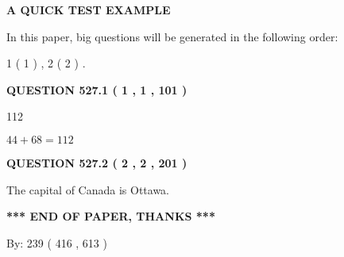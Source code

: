 \documentclass[12pt]{article}
\begin{document}
   
   
   
   
   
 \vspace{0.2in}
{\LARGE {\textbf{ A QUICK TEST EXAMPLE}}}
   
   
   
\vspace{0.2in}
   
In this paper, big questions will be generated in the following order: 
   
   
   1 ( 1 )
 ,
   2 ( 2 )
 .
  
\vspace{0.2in}
  
{\textbf{\Large{QUESTION
527.1 
 ( 1 , 1 , 101 )
}}}
  
  
 
 
\noindent{}

112
 
 
 
 
\noindent{}

$ %
44 +  %
68=   %
112$
 
 
  
\vspace{0.2in}
  
{\textbf{\Large{QUESTION
527.2 
 ( 2 , 2 , 201 )
}}}
  
  
 
 
\noindent{}
 
 
The capital of Canada is Ottawa.
 
 
 
 
   
   
 \vspace{0.2in}
 
   
   
   
   
\vspace{1.0in} 
{\textbf{\large{ *** END OF PAPER, THANKS *** }}} 
   
   
\hspace{1.0in} By: 
 239 ( 416 ,  613 )
   
   
   
   
\newpage 
\setcounter{page}{ 
   528001 } 
   
\end{document}

